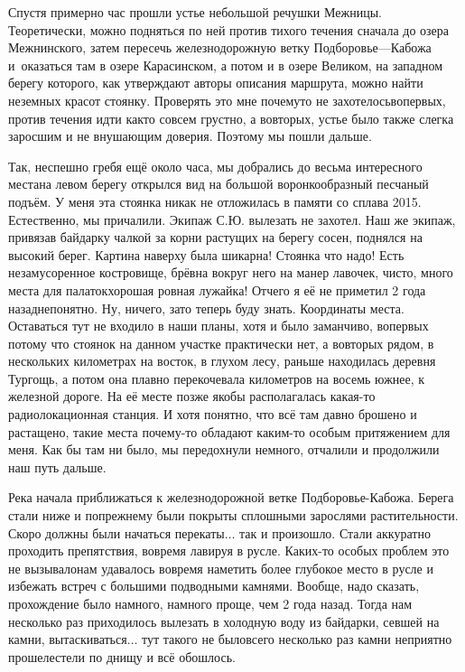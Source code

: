 Спустя примерно час прошли устье небольшой речушки Межницы. Теоретически, можно подняться по ней против тихого течения сначала до озера Межнинского, затем пересечь железнодорожную ветку Подборовье\thinspace\nobreakdash---\thinspace Кабожа и~оказаться там в озере Карасинском, а потом и в озере Великом, на западном берегу которого, как утверждают авторы описания маршрута, можно найти неземных красот стоянку. Проверять это мне почему\sdash то не захотелось\mdash во\sdash первых, против течения идти как\sdash то совсем грустно, а во\sdash вторых, устье было также слегка заросшим и не внушающим доверия. Поэтому мы пошли дальше.

Так, неспешно гребя ещё около часа, мы добрались до весьма интересного места\mdash на левом берегу открылся вид на большой воронкообразный песчаный подъём. У меня эта стоянка никак не отложилась в памяти со сплава 2015. Естественно, мы причалили. Экипаж С.Ю. вылезать не захотел. Наш же экипаж, привязав байдарку чалкой за корни растущих на берегу сосен, поднялся на высокий берег. Картина наверху была шикарна! Стоянка что надо! Есть незамусоренное костровище, брёвна вокруг него на манер лавочек, чисто, много места для палаток\mdash хорошая ровная лужайка! Отчего я её не приметил 2 года назад\mdash непонятно. Ну, ничего, зато теперь буду знать. Координаты места\mdash \CoordsLidSuperPlace. Оставаться тут не входило в наши планы, хотя и было заманчиво, во\sdash первых потому что стоянок на данном участке практически нет, а во\sdash вторых рядом, в нескольких километрах на восток, в глухом лесу, раньше находилась деревня Тургощь, а потом она плавно перекочевала километров на восемь южнее, к железной дороге. На её месте позже якобы располагалась какая-то радиолокационная станция. И хотя понятно, что всё там давно брошено и растащено, такие места почему-то обладают каким-то особым притяжением для меня. Как бы там ни было, мы передохнули немного, отчалили и продолжили наш путь дальше.

Река начала приближаться к железнодорожной ветке Подборовье-Кабожа. Берега стали ниже и по\sdash прежнему были покрыты сплошными зарослями растительности. Скоро должны были начаться перекаты$\ldots$ так и произошло. Стали аккуратно проходить препятствия, вовремя лавируя в русле. Каких-то особых проблем это не вызывало\mdash нам удавалось вовремя наметить более глубокое место в русле и избежать встреч с большими подводными камнями. Вообще, надо сказать, прохождение было намного, намного проще, чем 2 года назад. Тогда нам несколько раз приходилось вылезать в холодную воду из байдарки, севшей на камни, вытаскиваться$\ldots$ тут такого не было\mdash всего несколько раз камни неприятно прошелестели по днищу и всё обошлось. 

